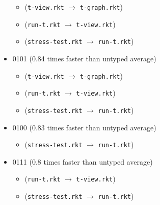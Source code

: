 \documentclass{article}
\newcommand{\mono}[1]{\texttt{#1}}
\begin{document}
\begin{itemize}
\begin{itemize}
  \item (\mono{t-view.rkt} $\rightarrow$ \mono{t-graph.rkt})
  \item (\mono{run-t.rkt} $\rightarrow$ \mono{t-view.rkt})
  \item (\mono{stress-test.rkt} $\rightarrow$ \mono{run-t.rkt})
  \end{itemize}
\item 0101 (0.84 times faster than untyped average)
  \begin{itemize}
  \item (\mono{t-view.rkt} $\rightarrow$ \mono{t-graph.rkt})
  \item (\mono{run-t.rkt} $\rightarrow$ \mono{t-view.rkt})
  \item (\mono{stress-test.rkt} $\rightarrow$ \mono{run-t.rkt})
  \end{itemize}
\item 0100 (0.83 times faster than untyped average)
  \begin{itemize}
  \item (\mono{stress-test.rkt} $\rightarrow$ \mono{run-t.rkt})
  \end{itemize}
\item 0111 (0.8 times faster than untyped average)
  \begin{itemize}
  \item (\mono{run-t.rkt} $\rightarrow$ \mono{t-view.rkt})
  \item (\mono{stress-test.rkt} $\rightarrow$ \mono{run-t.rkt})
  \end{itemize}


\end{itemize}
\end{document}

